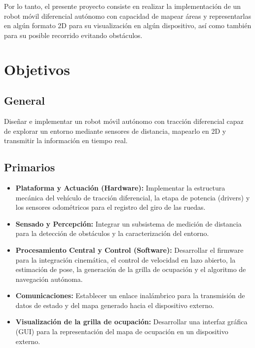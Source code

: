 \documentclass[12pt,a4paper]{article}
\begin{document}
Por lo tanto, el presente proyecto consiste en realizar la implementación de un robot móvil diferencial autónomo con capacidad de mapear áreas y representarlas en algún formato 2D para su visualización en algún dispositivo, así como también para su posible recorrido evitando obstáculos.

\newpage

\section{Objetivos}

\subsection{General}
Diseñar e implementar un robot móvil autónomo con tracción diferencial capaz de explorar un entorno mediante sensores de distancia, mapearlo en 2D y transmitir la información en tiempo real.


\subsection{Primarios}
\begin{itemize}
   \item \textbf{Plataforma y Actuación (Hardware):} Implementar la estructura mecánica del vehículo de tracción diferencial, la etapa de potencia (drivers) y los sensores odométricos para el registro del giro de las ruedas.
    \item \textbf{Sensado y Percepción:} Integrar un subsistema de medición de distancia para la detección de obstáculos y la caracterización del entorno.
    \item \textbf{Procesamiento Central y Control (Software):} Desarrollar el firmware para la integración cinemática, el control de velocidad en lazo abierto, la estimación de pose, la generación de la grilla de ocupación y el algoritmo de navegación autónoma.
    \item \textbf{Comunicaciones:} Establecer un enlace inalámbrico para la transmisión de datos de estado y del mapa generado hacia el dispositivo externo.
    \item \textbf{Visualización de la grilla de ocupación:} Desarrollar una interfaz gráfica (GUI) para la representación del mapa de ocupación en un dispositivo externo.
\end{itemize}
\end{document}
